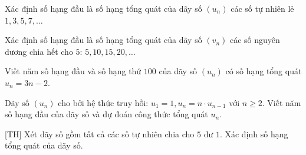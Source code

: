 \begin{bt}%
	Xác định số hạng đầu là số hạng tổng quát của dãy số $(u_n)$ các số tự nhiên lẻ $1, 3, 5, 7, \ldots $
\end{bt}

\begin{bt}%
	Xác định số hạng đầu là số hạng tổng quát của dãy số $(v_n)$ các số nguyên dương chia hết cho $5$: $5,10,15,20,\ldots$
\end{bt}

\begin{bt}%
	Viết năm số hạng đầu và số hạng thứ $100$ của dãy số $(u_n)$ có số hạng tổng quát $u_n=3n-2$.
\end{bt}

\begin{bt}%
	Dãy số $(u_n)$ cho bởi hệ thức truy hồi: $u_1=1, u_n=n \cdot u_{n-1}$ với $n \ge 2$. Viết năm số hạng đầu của dãy số và dự đoán công thức tổng quát $u_n$.
\end{bt}

\begin{bt}%
[TH]%
	Xét dãy số gồm tất cả các số tự nhiên chia cho $5$ dư $1$. Xác định số hạng tổng quát của dãy số.
\end{bt}

